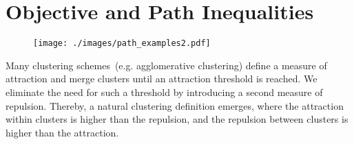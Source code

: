 \clearpage

\section{Objective and Path Inequalities\label{subsec:Clustering-path}}

\begin{figure}[t]
\centering
\texttt{[image: ./images/path\_examples2.pdf]}
\label{fig:path_examples}
\end{figure}


Many clustering schemes~(e.g. agglomerative clustering) define a measure of attraction and merge clusters until an attraction threshold is reached.
We eliminate the need for such a threshold by introducing a second measure of repulsion. Thereby, a natural clustering definition emerges, where the attraction within clusters is higher than the repulsion, and the repulsion between clusters is higher than the attraction.

